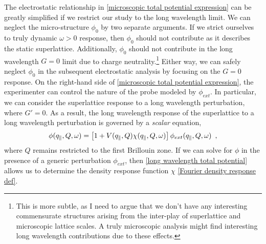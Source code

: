 The electrostatic relationship in \eqref{microscopic total potential expression} can be greatly simplified if we restrict our study to the long wavelength limit.  We can neglect the micro-structure $\phi_0$ by two separate arguments.  If we strict ourselves to truly dynamic $\omega>0$ response, then $\phi_0$ should not contribute as it describes the static superlattice.  Additionally, $\phi_0$ should not contribute in the long wavelength $G=0$ limit due to charge neutrality.\footnote{This is more subtle, as I need to argue that we don't have any interesting commensurate structures arising from the inter-play of superlattice and microscopic lattice scales.  A truly microscopic analysis might find interesting long wavelength contributions due to these effects.}  Either way, we can safely neglect $\phi_0$ in the subsequent electrostatic analysis by focusing on the $G=0$ response.  On the right-hand side of \eqref{microscopic total potential expression}, the experimenter can control the nature of the probe modeled by $\phi_{ext}$.  In particular, we can consider the superlattice response to a long wavelength perturbation, where $G'=0$.  As a result, the long wavelength response of the superlattice to a long wavelength perturbation is governed by a {\it scalar} equation,
\begin{equation}
    \label{long wavelength total potential}
    \phi(q_{\parallel}, Q, \omega) 
    =
    \left[
    1
    +
    V(q_{\parallel}, Q)
    \chi(q_{\parallel}, Q, \omega)
    \right]
    \phi_{ext}(q_{\parallel}, Q, \omega)
    \,\,\,,
\end{equation}
where $Q$ remains restricted to the first Brillouin zone.  If we can solve for $\phi$ in the presence of a generic perturbation $\phi_{ext}$, then \eqref{long wavelength total potential} allows us to determine the density response function $\chi$ \eqref{Fourier density response def}.